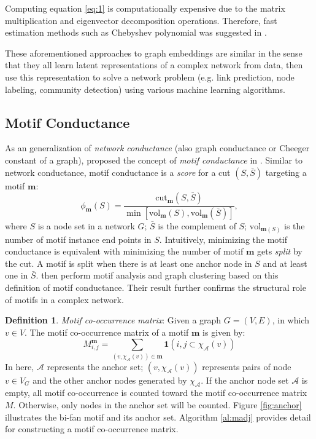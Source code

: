 \documentclass{article}
\theoremstyle{definition}
\newtheorem{definition}{Definition}[section]
\begin{document}
Computing equation \ref{eq:1} is computationally expensive
due to the matrix multiplication and eigenvector decomposition operations.
Therefore, fast estimation methods such as Chebyshev polynomial was suggested
in \cite{hammond2011wavelets}.

These aforementioned approaches to graph embeddings
are similar in the sense that they all learn latent representations
of a complex network from data, then use this representation to solve 
a network problem (e.g. link prediction, node labeling, community
detection) using various machine learning algorithms.

\subsection{Motif Conductance}

As an generalization of \emph{network conductance} (also graph conductance 
or Cheeger constant of a graph), \citeauthor{juremotif} proposed
the concept of \emph{motif conductance} in \cite{juremotif}. Similar to
network conductance, motif conductance is a \emph{score} for a cut 
$(S, \bar{S})$ targeting a motif $\mathbf{m}$:
\begin{equation*}
	\phi_{\mathbf{m}}(S) = \frac{\mbox{cut}_{\mathbf{m}}(S,\bar{S})}{\min[\mbox{vol}_{\mathbf{m}}(S), \mbox{vol}_{\mathbf{m}}(\bar{S})]},
\end{equation*}
where $S$ is a node set in a network $G$; $\bar{S}$ is the complement
of $S$; $\mbox{vol}_{\mathbf{m}(S)}$ is the number of motif instance
end points in $S$. Intuitively, minimizing the motif conductance is
equivalent with minimizing the number of motif $\mathbf{m}$ gets 
\emph{split} by the cut. A motif is split when there is at least one
anchor node in $S$ and at least one in $\bar{S}$. \citeauthor{juremotif}
then perform motif analysis and graph clustering based on this
definition of motif conductance. Their result further confirms the
structural role of motifs in a complex network. 

\begin{definition} \emph{Motif co-occurrence matrix}:
Given a graph $G = (V,E)$, in which $v \in V$. The motif co-occurrence 
matrix of a motif $\mathbf{m}$ is given by:
$$M_{i,j}^{\mathbf{m}} = \sum_{(v, \chi_{\mathcal{A}}(v)) \in \mathbf{m}} \mathbf{1}({i,j} \subset \chi_\mathcal{A}(v))$$
In here, $\mathcal{A}$ represents the anchor set; 
$(v, \chi_{\mathcal{A}}(v))$ represents pairs of node $v \in V_G$ and the 
other anchor nodes generated by $\chi_\mathcal{A}$. If the anchor node set 
$\mathcal{A}$ is empty, all motif co-occurrence is counted toward the 
motif co-occurrence matrix $M$. Otherwise, only nodes in the anchor set 
will be counted. Figure \ref{fig:anchor} illustrates the bi-fan motif and 
its anchor set. Algorithm \ref{al:madj} provides detail for constructing
a motif co-occurrence matrix.
\end{definition}
\end{document}
